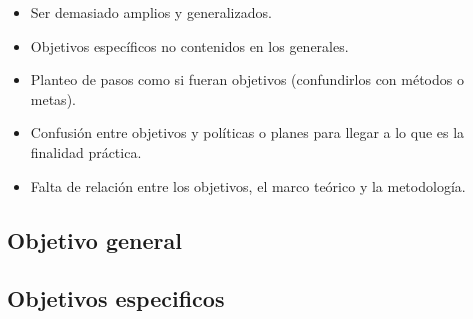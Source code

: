 \begin{itemize}
    \item Ser demasiado amplios y generalizados.
    \item Objetivos específicos no contenidos en los generales.
    \item Planteo de pasos como si fueran objetivos (confundirlos con métodos o metas).
		\item Confusión entre objetivos y políticas o planes para llegar a lo que es la finalidad práctica.
		\item Falta de relación entre los objetivos, el marco teórico y la metodología.
\end{itemize}

\subsection{Objetivo general}\label{sssec: objg}
\subsection{Objetivos especificos}\label{sssec: obje}

\newpage
